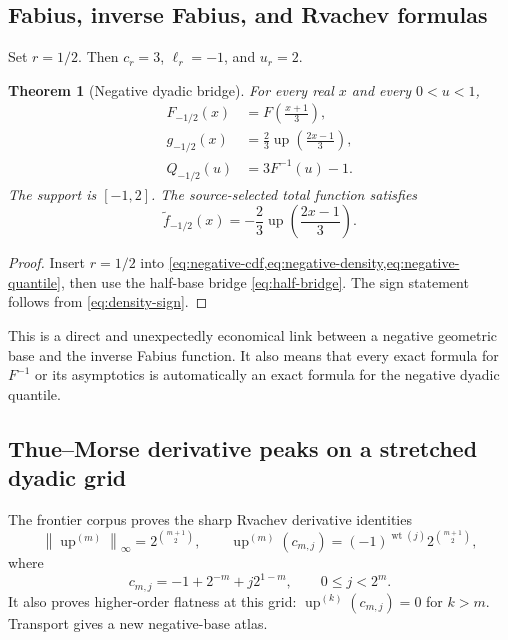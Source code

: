 \documentclass[11pt]{article}
\newtheorem{theorem}{Theorem}[section]
\theoremstyle{definition}
\newcommand{\Up}{\operatorname{up}}
\newcommand{\wt}{\operatorname{wt}}
\newcommand{\norm}[1]{\left\lVert #1\right\rVert}
\begin{document}
\subsection{Fabius, inverse Fabius, and Rvachev formulas}

Set \(r=1/2\).  Then \(c_r=3\), \(\ell_r=-1\), and \(u_r=2\).

\begin{theorem}[Negative dyadic bridge]\label{thm:negative-dyadic}
For every real \(x\) and every \(0<u<1\),
\begin{align}
 F_{-1/2}(x)&=F\!\left(\frac{x+1}{3}\right),              \label{eq:negative-dyadic-cdf}\\
 g_{-1/2}(x)&=\frac23\Up\!\left(\frac{2x-1}{3}\right),  \label{eq:negative-dyadic-density}\\
 Q_{-1/2}(u)&=3F^{-1}(u)-1.                               \label{eq:negative-dyadic-quantile}
\end{align}
The support is \([-1,2]\).  The source-selected total function satisfies
\begin{equation}
 \widetilde f_{-1/2}(x)=-\frac23\Up\!\left(\frac{2x-1}{3}\right). \label{eq:negative-dyadic-selected}
\end{equation}
\end{theorem}

\begin{proof}
Insert \(r=1/2\) into \cref{eq:negative-cdf,eq:negative-density,eq:negative-quantile},
then use the half-base bridge \cref{eq:half-bridge}.  The sign statement follows from
\cref{eq:density-sign}.
\end{proof}

This is a direct and unexpectedly economical link between a negative geometric base and
the inverse Fabius function.  It also means that every exact formula for \(F^{-1}\) or
its asymptotics is automatically an exact formula for the negative dyadic quantile.

\subsection{Thue--Morse derivative peaks on a stretched dyadic grid}

The frontier corpus proves the sharp Rvachev derivative identities
\begin{equation}
 \norm{\Up^{(m)}}_\infty=2^{\binom{m+1}{2}},
 \qquad
 \Up^{(m)}(c_{m,j})=(-1)^{\wt(j)}2^{\binom{m+1}{2}},       \label{eq:up-peaks-baseline}
\end{equation}
where
\begin{equation}
 c_{m,j}=-1+2^{-m}+j2^{1-m},
 \qquad 0\le j<2^m.                                      \label{eq:cmj}
\end{equation}
It also proves higher-order flatness at this grid: \(\Up^{(k)}(c_{m,j})=0\) for
\(k>m\).  Transport gives a new negative-base atlas.
\end{document}

